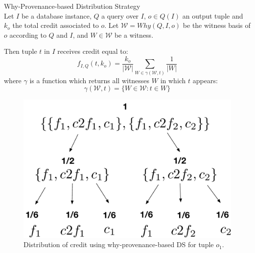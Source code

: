  \begin{definition}{Why-Provenance-based Distribution Strategy}\\
        \label{def:why_distribution}
    Let $I$ be a database instance, $Q$ a query over $I$, $o \in Q(I)$ an output tuple and $k_o$ the total credit associated to $o$. 
    Let $\mathcal{W} = Why(Q, I, o)$ be the witness basis of $o$ according to $Q$ and $I$, and $W \in \mathcal{W}$ be a witness. 
    
 
    Then tuple $t$ in $I$ receives credit equal to:
    \begin{equation*}
        f_{I, Q}(t, k_o) =
            \frac{k_o}{|\mathcal{W}|}\sum_{W \in \gamma(\mathcal{W}, t)}\frac{1}{|W|}
    \end{equation*}            
    where $\gamma$ is a function which returns all witnesses $W$ in which $t$ appears:
   $$\gamma(\mathcal{W}, t)=  \{W \in \mathcal{W} : t \in W\}$$
\end{definition}

\begin{figure}[]
\centering
  \includegraphics[width=.45\textwidth]{figures/why_distribution}
  \caption{Distribution of credit using why-provenance-based DS for tuple $o_1$.}
  \label{figure:why_prov_distribution}
\end{figure}

